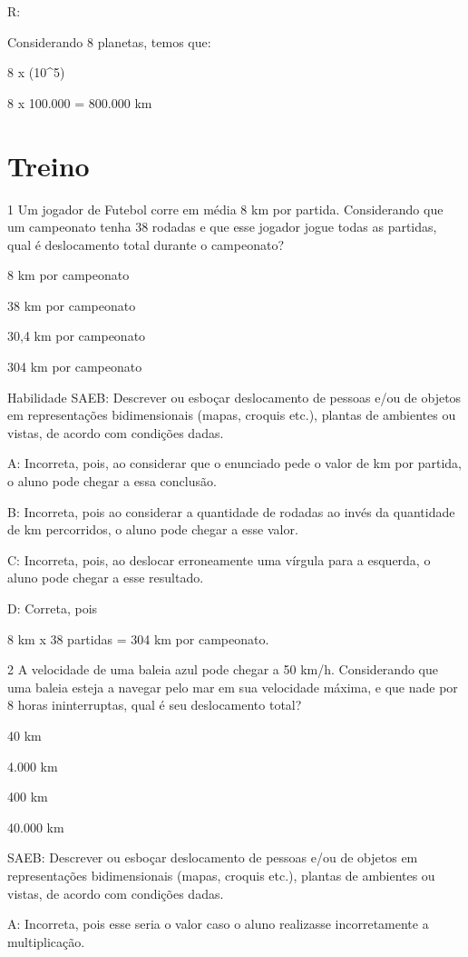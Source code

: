 {R:

Considerando 8 planetas, temos que:

8 x (10^5)

8 x 100.000 = 800.000 km

\section{Treino}

\num{1} Um jogador de Futebol corre em média 8 km por partida. Considerando
que um campeonato tenha 38 rodadas e que esse jogador jogue todas as
partidas, qual é deslocamento total durante o campeonato?
\item 8 km por campeonato
\item 38 km por campeonato
\item 30,4 km por campeonato
\item 304 km por campeonato

Habilidade SAEB: Descrever ou esboçar deslocamento de pessoas e/ou de
objetos em representações bidimensionais (mapas, croquis etc.), plantas
de ambientes ou vistas, de acordo com condições dadas.

A: Incorreta, pois, ao considerar que o enunciado pede o valor de km por
partida, o aluno pode chegar a essa conclusão.

B: Incorreta, pois ao considerar a quantidade de rodadas ao invés da
quantidade de km percorridos, o aluno pode chegar a esse valor.

C: Incorreta, pois, ao deslocar erroneamente uma vírgula para a
esquerda, o aluno pode chegar a esse resultado.

D: Correta, pois

8 km x 38 partidas = 304 km por campeonato.

\num{2} A velocidade de uma baleia azul pode chegar a 50 km/h. Considerando
que uma baleia esteja a navegar pelo mar em sua velocidade máxima, e que
nade por 8 horas ininterruptas, qual é seu deslocamento total?
\item 40 km
\item 4.000 km
\item 400 km
\item 40.000 km

SAEB: Descrever ou esboçar deslocamento de pessoas e/ou de objetos em
representações bidimensionais (mapas, croquis etc.), plantas de
ambientes ou vistas, de acordo com condições dadas.

A: Incorreta, pois esse seria o valor caso o aluno realizasse
incorretamente a multiplicação.

}
